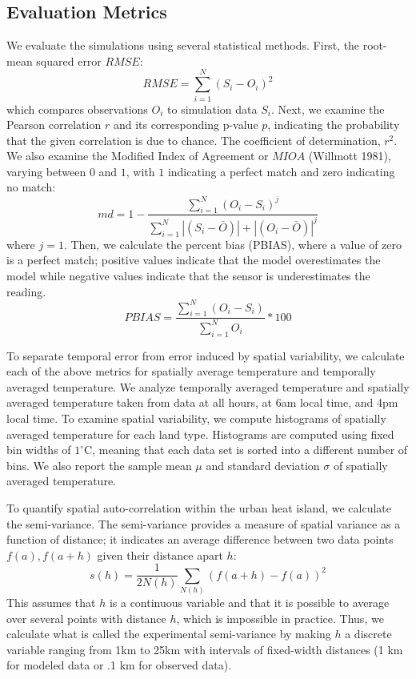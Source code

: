 \documentclass[draft,linenumbers]{agujournal}
\begin{document}
\subsection{Evaluation Metrics}
\label{sec:methods_evaluation}
We evaluate the simulations using several statistical methods. 
First, the root-mean squared error $RMSE$:  
\begin{equation}%
RMSE = \sum_{i=1}^{N} \left(S_i - O_i\right)^2
\end{equation}
which compares observations $O_i$ to simulation data $S_i$.
Next, we examine the Pearson correlation $r$ and its corresponding p-value $p$, indicating the probability that the given correlation is due to chance. The coefficient of determination, $r^2$. We also examine the Modified Index of Agreement or $MIOA$ (Willmott 1981), varying between \(0\) and \(1\), with \(1\) indicating a perfect match and zero indicating no match: 
\begin{equation}
md = 1 - \frac{\sum_{i=1}^{N}(O_{i}-S_{i})^{j}}{\sum_{i=1}^{N}|(S_{i}-\bar{O})|+|(O_{i}-\bar{O})|^{j}}
\end{equation}
where $j=1$. 
Then, we calculate the percent bias (PBIAS), where a value of zero is a perfect match; positive values indicate that the model overestimates the model while negative values indicate that the sensor is underestimates the reading.
\begin{equation}
PBIAS = \frac{\sum_{i=1}^{N}(O_{i}-S_{i})}{\sum_{i=1}^{N}O_{i}}*100
\end{equation}

To separate temporal error from error induced by spatial variability, we calculate each of the above metrics for spatially average temperature and temporally averaged temperature. We analyze temporally averaged temperature and spatially averaged temperature taken from data at all hours, at 6am local time, and 4pm local time. 
To examine spatial variability, we compute histograms of spatially averaged temperature for each land type. Histograms are computed using fixed bin widths of $1^\circ$C, meaning that each data set is sorted into a different number of bins. We also report the sample mean $\mu$ and standard deviation $\sigma$ of spatially averaged temperature. 

To quantify spatial auto-correlation within the urban heat island, we calculate the semi-variance. The semi-variance provides a measure of spatial variance as a function of distance; it indicates an average difference between two data points $f(a), f(a+h)$ given their distance apart $h$: 
\begin{equation}
 s(h) = \frac{1}{2 N(h)} \sum _{N(h)} \left(f(a+h) -f(a)\right)^2
\label{eq:semivariogram}
\end{equation}
This assumes that $h$ is a continuous variable and that it is possible to average over several points with distance $h$, which is impossible in practice. Thus, we calculate what is called the experimental semi-variance by making $h$ a discrete variable ranging from 1km to 25km with intervals of fixed-width distances (1 km for modeled data or .1 km for observed data). 
\end{document}
